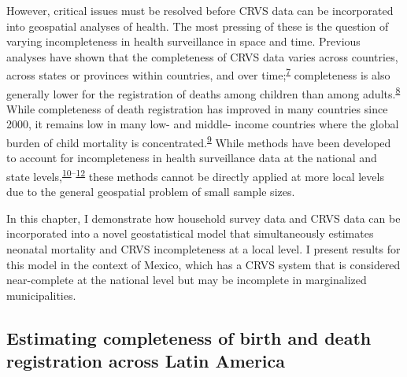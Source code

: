 \documentclass[
]{article}
\begin{document}
However, critical issues must be resolved before CRVS data can be incorporated into geospatial analyses of health. The most pressing of these is the question of varying incompleteness in health surveillance in space and time. Previous analyses have shown that the completeness of CRVS data varies across countries, across states or provinces within countries, and over time;\textsuperscript{\protect\hyperlink{ref-Adair2018}{7}} completeness is also generally lower for the registration of deaths among children than among adults.\textsuperscript{\protect\hyperlink{ref-Malqvist2008}{8}} While completeness of death registration has improved in many countries since 2000, it remains low in many low- and middle- income countries where the global burden of child mortality is concentrated.\textsuperscript{\protect\hyperlink{ref-Mikkelsen2015}{9}} While methods have been developed to account for incompleteness in health surveillance data at the national and state levels,\textsuperscript{\protect\hyperlink{ref-Murray2010}{10}--\protect\hyperlink{ref-Bhat2002}{12}} these methods cannot be directly applied at more local levels due to the general geospatial problem of small sample sizes.

In this chapter, I demonstrate how household survey data and CRVS data can be incorporated into a novel geostatistical model that simultaneously estimates neonatal mortality and CRVS incompleteness at a local level. I present results for this model in the context of Mexico, which has a CRVS system that is considered near-complete at the national level but may be incomplete in marginalized municipalities.

\hypertarget{estimating-completeness-of-birth-and-death-registration-across-latin-america}{%
\subsection{Estimating completeness of birth and death registration across Latin America}\label{estimating-completeness-of-birth-and-death-registration-across-latin-america}}
\end{document}

